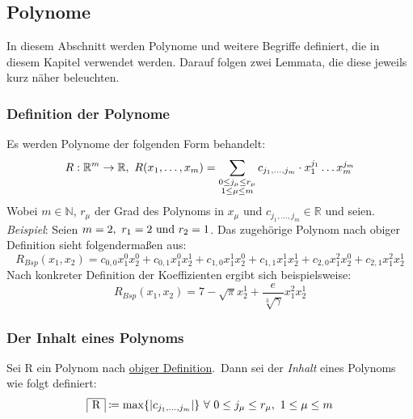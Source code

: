 
\subsection{Polynome}
    \label{subsec:polynomials}
    \textrm{In diesem Abschnitt werden Polynome und weitere Begriffe definiert, die in diesem Kapitel verwendet werden.
    Darauf folgen zwei Lemmata, die diese jeweils kurz näher beleuchten.}
    
    \subsubsection{Definition der Polynome}
        \label{subsubsec:def-poly}
        Es werden Polynome der folgenden Form behandelt:
        \begin{equation}
            R : \mathbb{R}^m \rightarrow \mathbb{R},\
            R(x_1, \dots, x_m) = \sum_{\substack{0 \leq j_\mu \leq r_\mu \\ 1 \leq \mu \leq m}}
            c_{j_1, \dots, j_m} \cdot x_1^{j_1} \dots x_m^{j_m} \label{eq:def-poly}
        \end{equation}
        Wobei $m \in \mathbb{N}$, $r_\mu$ der Grad des Polynoms in $x_\mu$ und $c_{j_1, \dots, j_m} \in
        \mathbb{R}$ und seien.
        \newline \newline
        \emph{Beispiel}: Seien $m = 2,\ r_1 = 2 \ \textrm{und}\  r_2 = 1$.
        \newline
        \textrm{Das zugehörige Polynom nach obiger Definition sieht folgendermaßen aus:}
        \begin{equation*}
            R_{Bsp}(x_1, x_2) = c_{0,0} x_1^0 x_2^0 + c_{0,1} x_1^0 x_2^1 + c_{1,0} x_1^1 x_2^0 + c_{1,1} x_1^1
            x_2^1 + c_{2, 0} x_1^2 x_2^0 + c_{2,1} x_1^2 x_2^1
        \end{equation*}
        Nach konkreter Definition der Koeffizienten ergibt sich beispielsweise:
        \begin{equation*}
            R_{Bsp}(x_1, x_2) = 7 - \sqrt{\pi} x_2^1 + \frac{e}{\sqrt[3]{\gamma}} x_1^2 x_2^1
        \end{equation*}
    
    \subsubsection{Der Inhalt eines Polynoms}
        \label{subsubsec:content-poly}
        Sei R ein Polynom nach \hyperref[subsubsec:def-poly]{obiger Definition}.\ Dann sei der \emph{Inhalt} eines
        Polynoms wie folgt definiert:
        \begin{equation}
            \content{R} \coloneq \max\{|c_{\enum{j_1}{j_m}}| \} \  \forall \  0 \leq j_\mu \leq r_\mu, \
            1 \leq \mu \leq m \label{eq:def-content}
        \end{equation}
    
